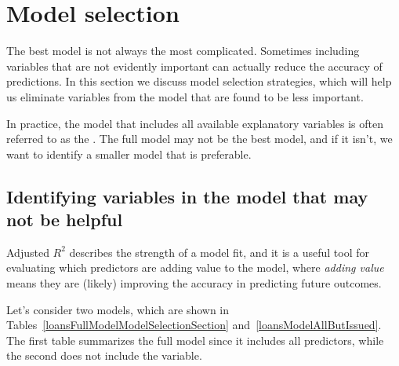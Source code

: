 \section{Model selection}
\label{model_selection_section}
\label{modelSelection}


The best model is not always the most complicated.
Sometimes including variables that are not evidently
important can actually reduce the accuracy of predictions.
In this section we discuss model selection strategies,
which will help us eliminate variables from the model that
are found to be less important.

In practice, the model that includes all available explanatory
variables is often referred to as the .
The full model may not be the best model, and if it isn't,
we want to identify a smaller model that is preferable.


\subsection{Identifying variables in the model that may
    not be helpful}

Adjusted $R^2$ describes the strength of a model fit,
and it is a useful tool for evaluating which predictors
are adding value to the model, where \emph{adding value}
means they are (likely) improving the accuracy in
predicting future outcomes.

Let's consider two models, which are shown in
Tables~\ref{loansFullModelModelSelectionSection}
and~\ref{loansModelAllButIssued}.
The first table summarizes the full model since it includes
all predictors, while the second does not include the
 variable.

